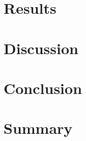 \documentclass[14pt,a4paper,onecolumn]{article}
\begin{document}
\section{Results}

\section{Discussion}

\section{Conclusion}

\section{Summary}

\newpage


\end{document}
